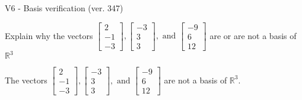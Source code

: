 \begin{exercise}
  \begin{exerciseTitle}V6 - Basis verification (ver. 347)\end{exerciseTitle}
  \begin{exerciseStatement}
    Explain why the vectors \(\left[\begin{array}{r}
2 \\
-1 \\
-3
\end{array}\right] , \left[\begin{array}{r}
-3 \\
3 \\
3
\end{array}\right] , \text{ and } \left[\begin{array}{r}
-9 \\
6 \\
12
\end{array}\right]\) are or are not a basis of \(\mathbb{R}^3\)	


  \end{exerciseStatement}
  \begin{exerciseAnswer}
   The vectors \(\left[\begin{array}{r}
2 \\
-1 \\
-3
\end{array}\right] , \left[\begin{array}{r}
-3 \\
3 \\
3
\end{array}\right] , \text{ and } \left[\begin{array}{r}
-9 \\
6 \\
12
\end{array}\right]\) 
  	 are not  a basis of \(\mathbb{R}^3\).
  


  \end{exerciseAnswer}
\end{exercise}